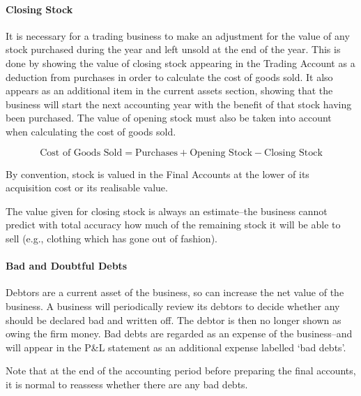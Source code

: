\documentclass[
]{article}
\newenvironment{Shaded}{}{}
\newcommand{\NormalTok}[1]{#1}
\begin{document}
\hypertarget{closing-stock}{%
\paragraph{Closing Stock}\label{closing-stock}}

It is necessary for a trading business to make an adjustment for the
value of any stock purchased during the year and left unsold at the end
of the year. This is done by showing the value of closing stock
appearing in the Trading Account as a deduction from purchases in order
to calculate the cost of goods sold. It also appears as an additional
item in the current assets section, showing that the business will start
the next accounting year with the benefit of that stock having been
purchased. The value of opening stock must also be taken into account
when calculating the cost of goods sold.

\[\text{Cost of Goods Sold} = \text{Purchases} + \text{Opening Stock} - \text{Closing Stock}\]

\begin{Shaded}
\begin{Highlighting}[]
\NormalTok{By convention, stock is valued in the Final Accounts at the lower of its acquisition cost or its realisable value.}
\end{Highlighting}
\end{Shaded}

The value given for closing stock is always an estimate--the business
cannot predict with total accuracy how much of the remaining stock it
will be able to sell (e.g., clothing which has gone out of fashion).

\hypertarget{bad-and-doubtful-debts}{%
\paragraph{Bad and Doubtful Debts}\label{bad-and-doubtful-debts}}

Debtors are a current asset of the business, so can increase the net
value of the business. A business will periodically review its debtors
to decide whether any should be declared bad and written off. The debtor
is then no longer shown as owing the firm money. Bad debts are regarded
as an expense of the business--and will appear in the P\&L statement as
an additional expense labelled `bad debts'.

Note that at the end of the accounting period before preparing the final
accounts, it is normal to reassess whether there are any bad debts.
\end{document}
